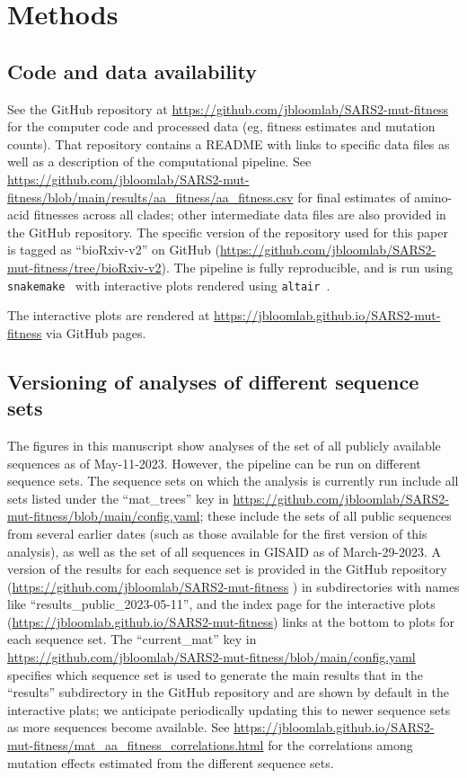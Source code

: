 \documentclass[9pt,twocolumn,twoside]{gsajnl_modified}
\begin{document}
{\small

\section{Methods}
\subsection{Code and data availability}
See the GitHub repository at \url{https://github.com/jbloomlab/SARS2-mut-fitness} for the computer code and processed data (eg, fitness estimates and mutation counts).
That repository contains a README with links to specific data files as well as a description of the computational pipeline.
See \url{https://github.com/jbloomlab/SARS2-mut-fitness/blob/main/results/aa_fitness/aa_fitness.csv} for final estimates of amino-acid fitnesses across all clades; other intermediate data files are also provided in the GitHub repository.
The specific version of the repository used for this paper is tagged as ``bioRxiv-v2'' on GitHub (\url{https://github.com/jbloomlab/SARS2-mut-fitness/tree/bioRxiv-v2}).
The pipeline is fully reproducible, and is run using \texttt{snakemake}~\citep{molder2021sustainable} with interactive plots rendered using \texttt{altair}~\citep{vanderplas2018altair}.

The interactive plots are rendered at \url{https://jbloomlab.github.io/SARS2-mut-fitness} via GitHub pages.

\subsection{Versioning of analyses of different sequence sets}
The figures in this manuscript show analyses of the set of all publicly available sequences as of May-11-2023.
However, the pipeline can be run on different sequence sets.
The sequence sets on which the analysis is currently run include all sets listed under the ``mat\_trees'' key in \url{https://github.com/jbloomlab/SARS2-mut-fitness/blob/main/config.yaml}; these include the sets of all public sequences from several earlier dates (such as those available for the first version of this analysis), as well as the set of all sequences in GISAID as of March-29-2023.
A version of the results for each sequence set is provided in the GitHub repository (\url{https://github.com/jbloomlab/SARS2-mut-fitness} ) in subdirectories with names like ``results\_public\_2023-05-11'', and the index page for the interactive plots (\url{https://jbloomlab.github.io/SARS2-mut-fitness}) links at the bottom to plots for each sequence set.
The ``current\_mat'' key in \url{https://github.com/jbloomlab/SARS2-mut-fitness/blob/main/config.yaml} specifies which sequence set is used to generate the main results that in the ``results'' subdirectory in the GitHub repository and are shown by default in the interactive plats; we anticipate periodically updating this to newer sequence sets as more sequences become available.
See \url{https://jbloomlab.github.io/SARS2-mut-fitness/mat_aa_fitness_correlations.html} for the correlations among mutation effects estimated from the different sequence sets.

}
\end{document}
